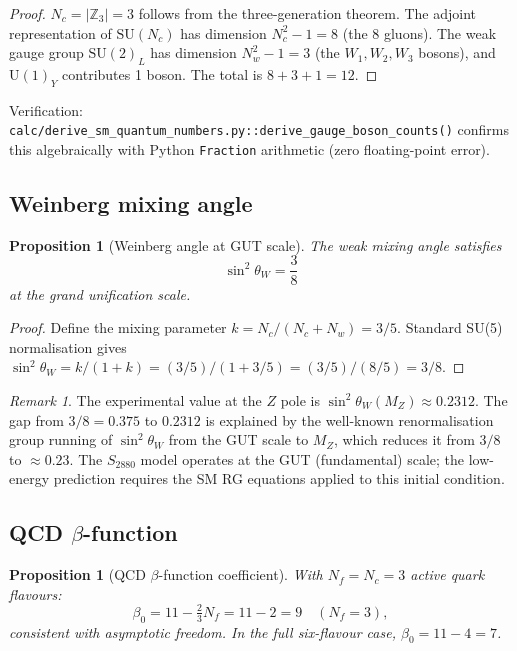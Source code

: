 \documentclass[11pt,a4paper]{article}
\newtheorem{proposition}[theorem]{Proposition}
\theoremstyle{remark}
\newtheorem{remark}[theorem]{Remark}
\begin{document}
\begin{proof}
  $N_c = |\mathbb{Z}_3| = 3$ follows from the three-generation theorem.
  The adjoint representation of $\mathrm{SU}(N_c)$ has dimension $N_c^2-1=8$ (the 8 gluons).
  The weak gauge group $\mathrm{SU}(2)_L$ has dimension $N_w^2-1=3$ (the $W_1,W_2,W_3$
  bosons), and $\mathrm{U}(1)_Y$ contributes 1 boson.  The total is $8+3+1=12$.
\end{proof}

Verification: \texttt{calc/derive\_sm\_quantum\_numbers.py::derive\_gauge\_boson\_counts()}
confirms this algebraically with Python \texttt{Fraction} arithmetic (zero floating-point error).

\subsection{Weinberg mixing angle}

\begin{proposition}[Weinberg angle at GUT scale]
  The weak mixing angle satisfies
  \begin{equation}
    \sin^2\!\theta_W = \frac{3}{8}
  \label{eq:Weinberg}
  \end{equation}
  at the grand unification scale.
  \label{prop:Weinberg}
\end{proposition}

\begin{proof}
  Define the mixing parameter
  $k = N_c/(N_c + N_w) = 3/5$.
  Standard SU(5) normalisation gives
  $\sin^2\!\theta_W = k/(1+k) = (3/5)/(1+3/5) = (3/5)/(8/5) = 3/8$.
\end{proof}

\begin{remark}
  The experimental value at the $Z$ pole is $\sin^2\!\theta_W(M_Z) \approx 0.2312$.
  The gap from $3/8 = 0.375$ to $0.2312$ is explained by the well-known renormalisation
  group running of $\sin^2\!\theta_W$ from the GUT scale to $M_Z$, which reduces it
  from $3/8$ to $\approx 0.23$.
  The $S_{2880}$ model operates at the GUT (fundamental) scale; the low-energy prediction
  requires the SM RG equations applied to this initial condition.
\end{remark}

\subsection{QCD $\beta$-function}

\begin{proposition}[QCD $\beta$-function coefficient]
  With $N_f = N_c = 3$ active quark flavours:
  \begin{equation}
    \beta_0 = 11 - \tfrac{2}{3} N_f = 11 - 2 = 9 \quad (N_f = 3) ,
  \end{equation}
  consistent with asymptotic freedom.  In the full six-flavour case, $\beta_0 = 11 - 4 = 7$.
\end{proposition}
\end{document}
